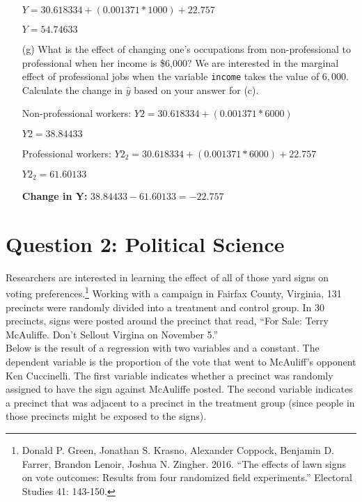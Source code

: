 \documentclass[12pt,letterpaper]{article}
\begin{document}
\begin{enumerate}
	\( Y = 30.618334+(0.001371*1000)+22.757 \)
	
		\( Y = 54.74633\)
	
	\vspace{1cm}
	
	
	\item [(g)]
	What is the effect of changing one's occupations from non-professional to professional when her income is \$6,000? We are interested in the marginal effect of professional jobs when the variable \texttt{income} takes the value of $6,000$. Calculate the change in $\hat{y}$ based on your answer for (c).
	
		\vspace{.5cm}
	Non-professional workers:
		\( Y2 = 30.618334+(0.001371*6000) \)
		
		\( Y2 = 38.84433\)
		
			\vspace{0.6cm}
	Professional workers:
		\(Y2_2 = 30.618334+(0.001371*6000)+22.757\)
		
		\(Y2_2 = 61.60133\)
		
			\vspace{0.6cm}
			
	\textbf{	Change in Y: }
\(38.84433 - 61.60133 = -22.757\)
			
\end{enumerate}

\newpage

\section*{Question 2: Political Science}
\vspace{.25cm}
\noindent 	Researchers are interested in learning the effect of all of those yard signs on voting preferences.\footnote{Donald P. Green, Jonathan	S. Krasno, Alexander Coppock, Benjamin D. Farrer,	Brandon Lenoir, Joshua N. Zingher. 2016. ``The effects of lawn signs on vote outcomes: Results from four randomized field experiments.'' Electoral Studies 41: 143-150. } Working with a campaign in Fairfax County, Virginia, 131 precincts were randomly divided into a treatment and control group. In 30 precincts, signs were posted around the precinct that read, ``For Sale: Terry McAuliffe. Don't Sellout Virgina on November 5.'' \\

Below is the result of a regression with two variables and a constant.  The dependent variable is the proportion of the vote that went to McAuliff's opponent Ken Cuccinelli. The first variable indicates whether a precinct was randomly assigned to have the sign against McAuliffe posted. The second variable indicates
a precinct that was adjacent to a precinct in the treatment group (since people in those precincts might be exposed to the signs).  \\
\end{document}
